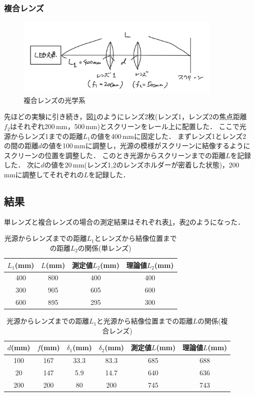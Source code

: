 \documentclass[titlepage]{jsarticle}
\begin{document}
\subsubsection{複合レンズ}

\begin{figure}
    \centering
    \includegraphics[width=10cm]{double.jpg}
    \caption{複合レンズの光学系}
    \label{fig:double}
\end{figure}

先ほどの実験に引き続き，図\ref{fig:double}のようにレンズ2枚(レンズ1，レンズ2の焦点距離$f_2$はそれぞれ200\,mm，500\,mm)とスクリーンをレール上に配置した．
ここで光源からレンズ1までの距離$L_1$の値を400\,mmに固定した．
まずレンズ1とレンズ2の間の距離$d$の値を100\,mmに調整し，光源の模様がスクリーンに結像するようにスクリーンの位置を調整した．
このとき光源からスクリーンまでの距離$L$を記録した．
次に$d$の値を20\,mm(レンズ1,2のレンズホルダーが密着した状態)，200\,mmに調整してそれぞれの$L$を記録した．

\subsection{結果}
単レンズと複合レンズの場合の測定結果はそれぞれ表\ref{tab:single_lens}，表\ref{tab:double_lens}のようになった．

\begin{table}[htbp]
    \centering
    \caption{光源からレンズまでの距離$L_1$とレンズから結像位置までの距離$L_2$の関係(単レンズ)}
    \label{tab:single_lens}
    \begin{tabular}{c|cc|c}
        $L_1$(mm) & $L$(mm) & 測定値$L_2$(mm) & 理論値$L_2$(mm) \\
        \hline\hline
        400 & 800 & 400 & 400\\
        300 & 905 & 605 & 600\\
        600 & 895 & 295 & 300\\
        \hline
    \end{tabular}
\end{table}

\begin{table}[htbp]
    \centering
    \caption{光源からレンズまでの距離$L_1$と光源から結像位置までの距離$L$の関係(複合レンズ)}
    \label{tab:double_lens}
    \begin{tabular}{c|cccc|c}
        $d$(mm) & $f$(mm) & $\delta_1$(mm) & $\delta_2$(mm) & 測定値$L$(mm) & 理論値$L$(mm) \\
        \hline\hline
        100 & 167 & 33.3 & 83.3 & 685 & 688\\
        20 & 147 & 5.9 & 14.7 & 640 & 636\\
        200 & 200 & 80 & 200 & 745 & 743\\
        \hline
    \end{tabular}
\end{table}
\end{document}
